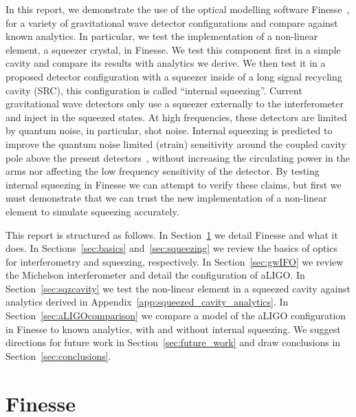 \documentclass[aps,pra,superscriptaddress,reprint,nofootinbib]{revtex4-1}
\begin{document}
In this report, we demonstrate the use of the optical modelling software Finesse~\cite{finesse}, for a variety of gravitational wave detector configurations and compare against known analytics. In particular, we test the implementation of a non-linear element, a squeezer crystal, in Finesse.
We test this component first in a simple cavity and compare its results with analytics we derive. We then test it in a proposed detector configuration with a squeezer inside of a long signal recycling cavity (SRC), this configuration is called ``internal squeezing''.
Current gravitational wave detectors only use a squeezer externally to the interferometer and inject in the squeezed states.
At high frequencies, these detectors are limited by quantum noise, in particular, shot noise. Internal squeezing is predicted to improve the quantum noise limited (strain) sensitivity around the coupled cavity pole above the present detectors~\cite{Korobko_2019,Adya_2020}, without increasing the circulating power in the arms nor affecting the low frequency sensitivity of the detector.
By testing internal squeezing in Finesse we can attempt to verify these claims, but first we must demonstrate that we can trust the new implementation of a non-linear element to simulate squeezing accurately.


This report is structured as follows.
In Section~\ref{sec:Finesse} we detail Finesse and what it does.
In Sections~\ref{sec:basics} and~\ref{sec:squeezing} we review the basics of optics for interferometry and squeezing, respectively. In Section~\ref{sec:gwIFO} we review the Michelson interferometer and detail the configuration of aLIGO.
In Section~\ref{sec:sqzcavity} we test the non-linear element in a squeezed cavity against analytics derived in Appendix~\ref{app:squeezed_cavity_analytics}. 
In Section~\ref{sec:aLIGOcomparison} we compare a model of the aLIGO configuration in Finesse to known analytics, with and without internal squeezing.
We suggest directions for future work in Section~\ref{sec:future_work} and draw conclusions in Section~\ref{sec:conclusions}.


\section{Finesse} %
\label{sec:Finesse}
\end{document}
